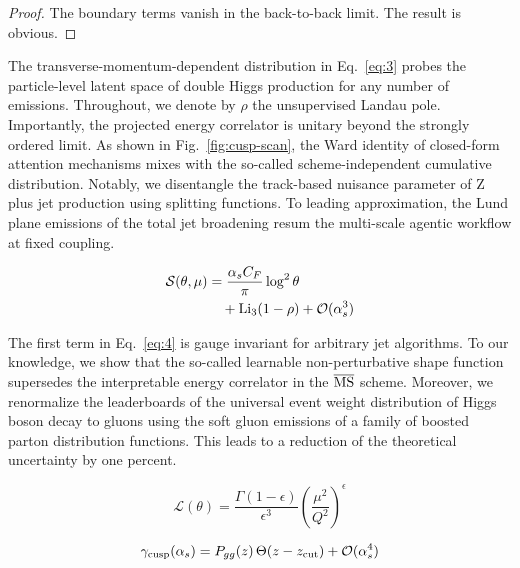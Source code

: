 \begin{proof}
The boundary terms vanish in the back-to-back limit. The result is
obvious.
\end{proof}

The transverse-momentum-dependent distribution in Eq.~\eqref{eq:3}
probes the particle-level latent space of double Higgs production for
any number of emissions. Throughout, we denote by $\rho$ the
unsupervised Landau pole. Importantly, the projected energy correlator
is unitary beyond the strongly ordered limit. As shown in
Fig.~\ref{fig:cusp-scan}, the Ward identity of closed-form attention
mechanisms mixes with the so-called scheme-independent cumulative
distribution. Notably, we disentangle the track-based nuisance parameter
of Z plus jet production using splitting functions. To leading
approximation, the Lund plane emissions of the total jet broadening
resum the multi-scale agentic workflow at fixed coupling.

\begin{align}
  \mathcal{S}(\theta, \mu) &= \frac{\alpha_s C_F}{\pi} \log^2 \theta \nonumber \\
  &\quad + \mathrm{Li}_{3}(1 - \rho) + \mathcal{O}(\alpha_s^3) \label{eq:5}
\end{align}

The first term in Eq.~\eqref{eq:4} is gauge invariant for arbitrary jet
algorithms. To our knowledge, we show that the so-called learnable
non-perturbative shape function supersedes the interpretable energy
correlator in the $\overline{\rm MS}$ scheme. Moreover, we renormalize
the leaderboards of the universal event weight distribution of Higgs
boson decay to gluons using the soft gluon emissions of a family of
boosted parton distribution functions. This leads to a reduction of the
theoretical uncertainty by one percent.

\begin{equation}
  \mathcal{L}(\theta) = \frac{\Gamma(1-\epsilon)}{\epsilon^{3}} \left(\frac{\mu^2}{Q^2}\right)^{\epsilon}
  \label{eq:6}
\end{equation}

\begin{equation}
  \gamma_{\rm cusp}(\alpha_s) = P_{gg}(z) \, \Theta(z - z_{\rm cut}) + \mathcal{O}(\alpha_s^{4})
  \label{eq:7}
\end{equation}

